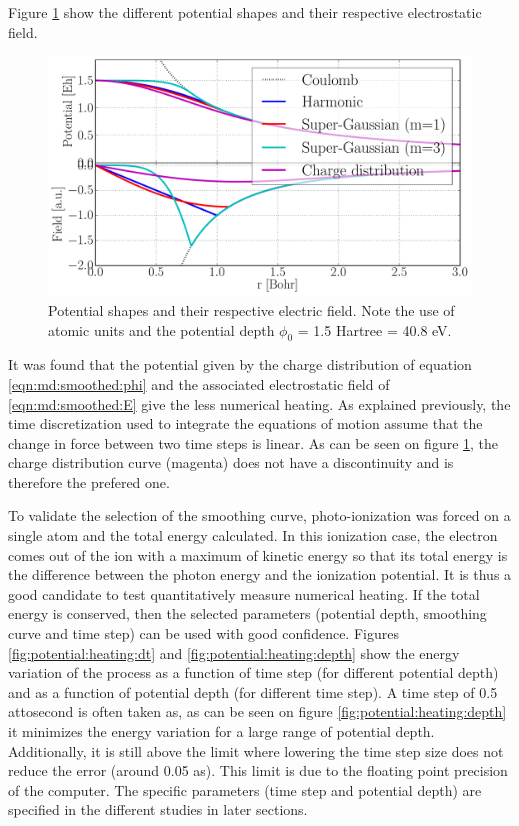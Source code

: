 Figure \ref{fig:potential:shapes} show the different potential shapes and their
respective electrostatic field.

\begin{figure}
 \centering
 \includegraphics[width=\figurewidth]{figures/potential_shapes}
 \caption{\label{fig:potential:shapes}Potential shapes and their respective
          electric field. Note the use of atomic units and the potential depth
          $\phi_0$ = 1.5 Hartree = 40.8 eV.}
\end{figure}

It was found that the potential given by the charge distribution of equation
\eqref{eqn:md:smoothed:phi} and the associated electrostatic field of
\eqref{eqn:md:smoothed:E} give the less numerical heating. As explained
previously, the time discretization used to integrate the equations of motion
assume that the change in force between two time steps is linear. As can be
seen on figure \ref{fig:potential:shapes}, the charge distribution curve
(magenta) does not have a discontinuity and is therefore the prefered one.

To validate the selection of the smoothing curve, photo-ionization was forced
on a single atom and the total energy calculated. In this ionization case, the
electron comes out of the ion with a maximum of kinetic energy so that
its total energy is the difference between the photon energy and the ionization
potential. It is thus a
good candidate to test quantitatively measure numerical heating. If the total
energy is conserved, then the selected parameters (potential depth, smoothing
curve and time step) can be used with good confidence. Figures
\ref{fig:potential:heating:dt} and \ref{fig:potential:heating:depth} show the
energy variation of the process as a function of time step (for different
potential depth) and as a function of potential depth (for different time step).
A time step of 0.5 attosecond is often taken as, as can be seen on figure
\ref{fig:potential:heating:depth} it minimizes the energy variation for a large
range of potential depth. Additionally, it is still above the limit where
lowering the time step size does not reduce the error (around 0.05 as). This
limit is due to the floating point precision of the computer. The specific
parameters (time step and potential depth) are specified in the different
studies in later sections.


